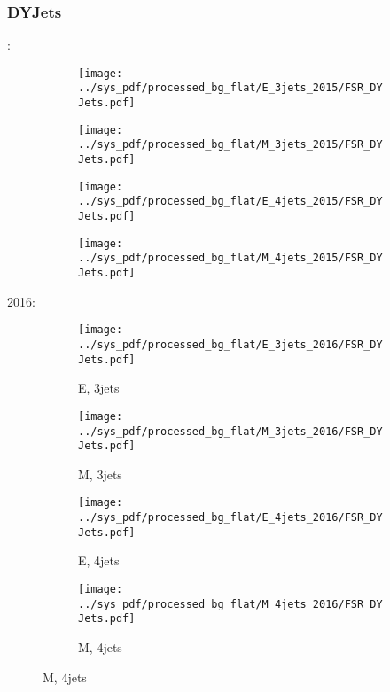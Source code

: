 \documentclass{beamer}
\begin{document}
\begin{frame}
\frametitle{DYJets}
\fontsize{5}{1}:
\begin{figure}
\centering
\begin{subfigure}[b]{0.24\textwidth}
\texttt{[image: ../sys\_pdf/processed\_bg\_flat/E\_3jets\_2015/FSR\_DYJets.pdf]}
\end{subfigure}
\begin{subfigure}[b]{0.24\textwidth}
\texttt{[image: ../sys\_pdf/processed\_bg\_flat/M\_3jets\_2015/FSR\_DYJets.pdf]}
\end{subfigure}
\begin{subfigure}[b]{0.24\textwidth}
\texttt{[image: ../sys\_pdf/processed\_bg\_flat/E\_4jets\_2015/FSR\_DYJets.pdf]}
\end{subfigure}
\begin{subfigure}[b]{0.24\textwidth}
\texttt{[image: ../sys\_pdf/processed\_bg\_flat/M\_4jets\_2015/FSR\_DYJets.pdf]}
\end{subfigure}
\end{figure}
2016:
\begin{figure}
\centering
\begin{subfigure}[b]{0.24\textwidth}
\texttt{[image: ../sys\_pdf/processed\_bg\_flat/E\_3jets\_2016/FSR\_DYJets.pdf]}
\captionsetup{font=tiny}
\caption{E, 3jets}
\end{subfigure}
\begin{subfigure}[b]{0.24\textwidth}
\texttt{[image: ../sys\_pdf/processed\_bg\_flat/M\_3jets\_2016/FSR\_DYJets.pdf]}
\captionsetup{font=tiny}
\caption{M, 3jets}
\end{subfigure}
\begin{subfigure}[b]{0.24\textwidth}
\texttt{[image: ../sys\_pdf/processed\_bg\_flat/E\_4jets\_2016/FSR\_DYJets.pdf]}
\captionsetup{font=tiny}
\caption{E, 4jets}
\end{subfigure}
\begin{subfigure}[b]{0.24\textwidth}
\texttt{[image: ../sys\_pdf/processed\_bg\_flat/M\_4jets\_2016/FSR\_DYJets.pdf]}
\captionsetup{font=tiny}
\caption{M, 4jets}
\end{subfigure}
\end{figure}
\end{frame}
\end{document}
